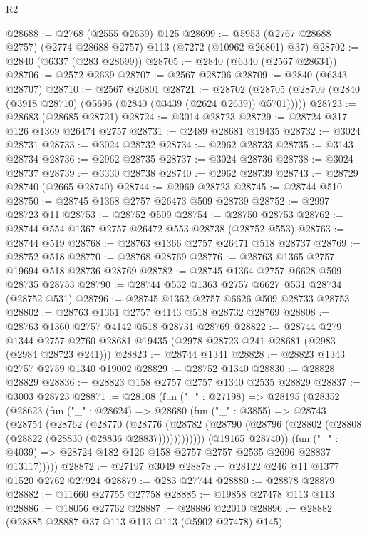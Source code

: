 \begin{lexlean}{R2}
\begin{coremodule}
@28688 := @2768 (@2555 @2639) @125
@28699 := @5953 (@2767 @28688 @2757) (@2774 @28688 @2757) @113 (@7272 (@10962 @26801) @37)
@28702 := @2840 (@6337 (@283 @28699))
@28705 := @2840 (@6340 (@2567 @28634))
@28706 := @2572 @2639
@28707 := @2567 @28706
@28709 := @2840 (@6343 @28707)
@28710 := @2567 @26801
@28721 := @28702
    (@28705 (@28709 (@2840 (@3918 @28710) (@5696 (@2840 (@3439 (@2624 @2639)) @5701)))))
@28723 := @28683 (@28685 @28721)
@28724 := @3014 @28723
@28729 := @28724 @317 @126 @1369 @26474 @2757
@28731 := @2489 @28681 @19435
@28732 := @3024 @28731
@28733 := @3024 @28732
@28734 := @2962 @28733
@28735 := @3143 @28734
@28736 := @2962 @28735
@28737 := @3024 @28736
@28738 := @3024 @28737
@28739 := @3330 @28738
@28740 := @2962 @28739
@28743 := @28729 @28740 (@2665 @28740)
@28744 := @2969 @28723
@28745 := @28744 @510
@28750 := @28745 @1368 @2757 @26473 @509 @28739
@28752 := @2997 @28723 @11
@28753 := @28752 @509
@28754 := @28750 @28753
@28762 := @28744 @554 @1367 @2757 @26472 @553 @28738 (@28752 @553)
@28763 := @28744 @519
@28768 := @28763 @1366 @2757 @26471 @518 @28737
@28769 := @28752 @518
@28770 := @28768 @28769
@28776 := @28763 @1365 @2757 @19694 @518 @28736 @28769
@28782 := @28745 @1364 @2757 @6628 @509 @28735 @28753
@28790 := @28744 @532 @1363 @2757 @6627 @531 @28734 (@28752 @531)
@28796 := @28745 @1362 @2757 @6626 @509 @28733 @28753
@28802 := @28763 @1361 @2757 @4143 @518 @28732 @28769
@28808 := @28763 @1360 @2757 @4142 @518 @28731 @28769
@28822 := @28744
    @279
    @1344
    @2757
    @2760
    @28681
    @19435
    (@2978 @28723 @241 @28681 (@2983 (@2984 @28723 @241)))
@28823 := @28744 @1341
@28828 := @28823 @1343 @2757 @2759 @1340 @19002
@28829 := @28752 @1340
@28830 := @28828 @28829
@28836 := @28823 @158 @2757 @2757 @1340 @2535 @28829
@28837 := @3003 @28723
@28871 := @28108
    (fun ("_" : @27198) =>
    @28195
      (@28352
        (@28623
          (fun ("_" : @28624) =>
          @28680
            (fun ("_" : @3855) =>
            @28743
              (@28754
                (@28762
                  (@28770
                    (@28776
                      (@28782
                        (@28790 (@28796 (@28802 (@28808 (@28822 (@28830 (@28836 @28837))))))))))))
              (@19165 @28740))
            (fun ("_" : @4039) => @28724 @182 @126 @158 @2757 @2757 @2535 @2696 @28837 @13117)))))
@28872 := @27197 @3049
@28878 := @28122 @246 @11 @1377 @1520 @2762 @27924
@28879 := @283 @27744
@28880 := @28878 @28879
@28882 := @11660 @27755 @27758
@28885 := @19858 @27478 @113 @113
@28886 := @18056 @27762
@28887 := @28886 @22010
@28896 := @28882 (@28885 @28887 @37 @113 @113 @113 (@5902 @27478) @145)

\end{coremodule}
\end{lexlean}
